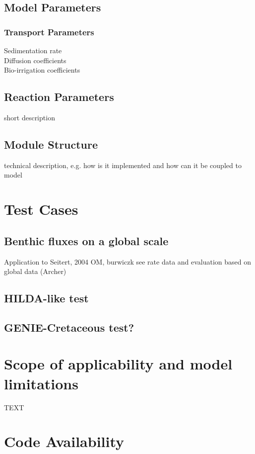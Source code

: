 \documentclass[gmd, manuscript]{copernicus}
\begin{document}
\subsection{Model Parameters}
\subsubsection{Transport Parameters}
Sedimentation rate\\
Diffusion coefficients\\
Bio-irrigation coefficients\\

\subsection {Reaction Parameters}
short description

\subsection{Module Structure}
technical description, e.g. how is it implemented and how can it be coupled to model

\section {Test Cases}
\subsection{Benthic fluxes on a global scale}
Application to Seitert, 2004 OM, burwiczk see rate data and evaluation based on global data (Archer)

\subsection{HILDA-like test}

\subsection{GENIE-Cretaceous test?}

\section{Scope of applicability and model limitations}



\conclusions  %
TEXT

\section {Code Availability}
\end{document}
